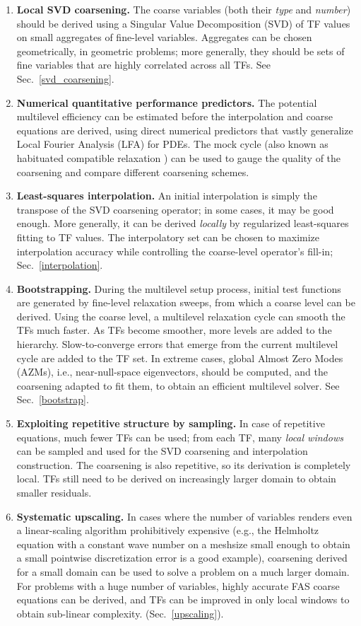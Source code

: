 \documentclass{article}
\begin{document}
\begin{enumerate}
    \item {\bf Local SVD coarsening.} The coarse variables (both their {\it type} and {\it number}) should be derived using a Singular Value Decomposition (SVD) of TF values on small aggregates of fine-level variables. Aggregates can be chosen geometrically, in geometric problems; more generally, they should be sets of fine variables that are highly correlated across all TFs. See Sec.~\ref{svd_coarsening}.
    \item {\bf Numerical quantitative performance predictors.} The potential multilevel efficiency can be estimated before the interpolation and coarse equations are derived, using direct numerical predictors that vastly generalize Local Fourier Analysis (LFA) for PDEs. The mock cycle (also known as habituated compatible relaxation \cite{mg_guide, cr_oren}) can be used to gauge the quality of the coarsening and compare different coarsening schemes.
    \item {\bf Least-squares interpolation.} An initial interpolation is simply the transpose of the SVD coarsening operator; in some cases, it may be good enough. More generally, it can be derived {\it locally} by regularized least-squares fitting to TF values. The interpolatory set can be chosen to maximize interpolation accuracy while controlling the coarse-level operator's fill-in; Sec.~\ref{interpolation}.
    \item {\bf Bootstrapping.} During the multilevel setup process, initial test functions are generated by fine-level relaxation sweeps, from which a coarse level can be derived. Using the coarse level, a multilevel relaxation cycle can smooth the TFs much faster. As TFs become smoother, more levels are added to the hierarchy. Slow-to-converge errors that emerge from the current multilevel cycle are added to the TF set. In extreme cases, global Almost Zero Modes (AZMs), i.e., near-null-space eigenvectors, should be computed, and the coarsening adapted to fit them, to obtain an efficient multilevel solver. See Sec.~\ref{bootstrap}.
	\item {\bf Exploiting repetitive structure by sampling.} In case of repetitive equations, much fewer TFs can be used; from each TF, many {\it local windows} can be sampled and used for the SVD coarsening and interpolation construction. The coarsening is also repetitive, so its derivation is completely local. TFs still need to be derived on increasingly larger domain to obtain smaller residuals.
	\item {\bf Systematic upscaling.} In cases where the number of variables renders even a linear-scaling algorithm prohibitively expensive (e.g., the Helmholtz equation with a constant wave number on a meshsize small enough to obtain a small pointwise discretization error is a good example), coarsening derived for a small domain can be used to solve a problem on a much larger domain. For problems with a huge number of variables, highly accurate FAS coarse equations can be derived, and TFs can be improved in only local windows to obtain sub-linear complexity. (Sec.~\ref{upscaling}).
\end{enumerate}
\end{document}
